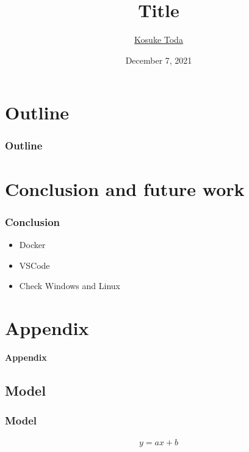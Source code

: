 \documentclass[aspectratio=169, unicode, 14pt]{beamer}
\title[short title]{Title}
\author{\underline{Kosuke Toda}} %
\institute[]
{
Graduate School of Engineering Science, Osaka University
}
\date{December 7, 2021} %
\begin{document}
\begin{frame}
\frametitle{}
\titlepage
\end{frame}


\section*{Outline}
\begin{frame}[t]\frametitle{Outline}
\tableofcontents
\end{frame}

\section{Conclusion and future work}
\begin{frame}[t]\frametitle{Conclusion}
  \begin{itemize}
    \item Docker
    \item VSCode
    \item Check Windows and Linux
  \end{itemize}
\end{frame}

\backupbegin

\section*{Appendix}
\begin{frame}
  \textbf{\LARGE{Appendix}}
\end{frame}

\subsection*{Model}
\begin{frame}[t]\frametitle{Model}
  \begin{align}
  y = ax + b \nonumber
  \end{align}
\end{frame}


\backupend
\end{document}
